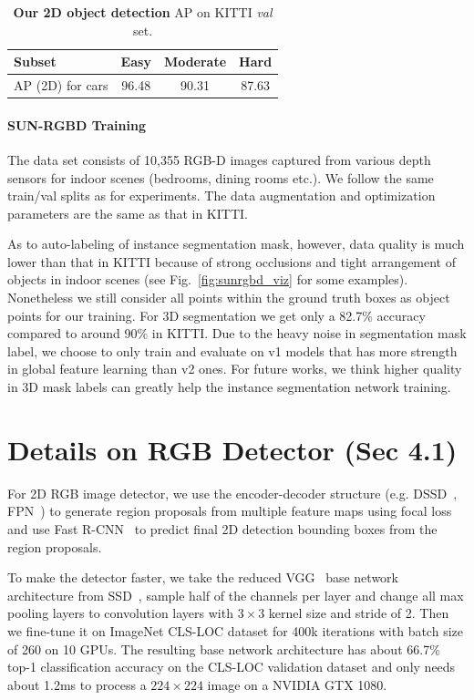 \begin{table}[t!]
\centering
\begin{tabular}{l|ccc}
\hline
Subset & Easy    & Moderate    & Hard   \\ \hline
AP (2D) for cars   & 96.48 & 90.31 & 87.63 \\ \hline
\end{tabular}
\caption{\textbf{Our 2D object detection} AP on KITTI \emph{val} set.}
\label{tab:kitti_val_2d_detection}
\end{table}


\paragraph{SUN-RGBD Training} The data set consists of 10,355 RGB-D images captured from various depth sensors for indoor scenes (bedrooms, dining rooms etc.). We follow the same train/val splits as \cite{song2015sun,ren2016three} for experiments. The data augmentation and optimization parameters are the same as that in KITTI.

As to auto-labeling of instance segmentation mask, however, data quality is much lower than that in KITTI because of strong occlusions and tight arrangement of objects in indoor scenes (see Fig.~\ref{fig:sunrgbd_viz} for some examples). Nonetheless we still consider all points within the ground truth boxes as object points for our training. For 3D segmentation we get only a 82.7\% accuracy compared to around 90\% in KITTI. Due to the heavy noise in segmentation mask label, we choose to only train and evaluate on v1 models that has more strength in global feature learning than v2 ones. For future works, we think higher quality in 3D mask labels can greatly help the instance segmentation network training.


\section{Details on RGB Detector (Sec 4.1)}
\label{sec:supp_rgb_detector}

For 2D RGB image detector, we use the encoder-decoder structure (e.g. DSSD~\cite{fu2017dssd}, FPN~\cite{lin2016feature}) to generate region proposals from multiple feature maps using focal loss~\cite{lin2017focal} and use Fast R-CNN~\cite{girshick2015fast} to predict final 2D detection bounding boxes from the region proposals.

To make the detector faster, we take the reduced VGG~\cite{simonyan2014very} base network architecture from SSD~\cite{liu2016ssd}, sample half of the channels per layer and change all max pooling layers to convolution layers with $3\times3$ kernel size and stride of 2. Then we fine-tune it on ImageNet CLS-LOC dataset for 400k iterations with batch size of 260 on 10 GPUs. The resulting base network architecture has about 66.7\% top-1 classification accuracy on the CLS-LOC validation dataset and only needs about 1.2ms to process a $224\times224$ image on a NVIDIA GTX 1080.

